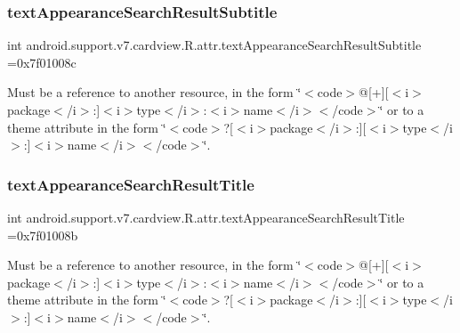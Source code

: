 \subsubsection{\texorpdfstring{text\+Appearance\+Search\+Result\+Subtitle}{textAppearanceSearchResultSubtitle}}
{\footnotesize\ttfamily int android.\+support.\+v7.\+cardview.\+R.\+attr.\+text\+Appearance\+Search\+Result\+Subtitle =0x7f01008c\hspace{0.3cm}{\ttfamily [static]}}

Must be a reference to another resource, in the form \char`\"{}$<$code$>$@\mbox{[}+\mbox{]}\mbox{[}$<$i$>$package$<$/i$>$\+:\mbox{]}$<$i$>$type$<$/i$>$\+:$<$i$>$name$<$/i$>$$<$/code$>$\char`\"{} or to a theme attribute in the form \char`\"{}$<$code$>$?\mbox{[}$<$i$>$package$<$/i$>$\+:\mbox{]}\mbox{[}$<$i$>$type$<$/i$>$\+:\mbox{]}$<$i$>$name$<$/i$>$$<$/code$>$\char`\"{}. \mbox{\label{classandroid_1_1support_1_1v7_1_1cardview_1_1R_1_1attr_a7ef9f14e832603a80a69a476d01e22f3}} 
\subsubsection{\texorpdfstring{text\+Appearance\+Search\+Result\+Title}{textAppearanceSearchResultTitle}}
{\footnotesize\ttfamily int android.\+support.\+v7.\+cardview.\+R.\+attr.\+text\+Appearance\+Search\+Result\+Title =0x7f01008b\hspace{0.3cm}{\ttfamily [static]}}

Must be a reference to another resource, in the form \char`\"{}$<$code$>$@\mbox{[}+\mbox{]}\mbox{[}$<$i$>$package$<$/i$>$\+:\mbox{]}$<$i$>$type$<$/i$>$\+:$<$i$>$name$<$/i$>$$<$/code$>$\char`\"{} or to a theme attribute in the form \char`\"{}$<$code$>$?\mbox{[}$<$i$>$package$<$/i$>$\+:\mbox{]}\mbox{[}$<$i$>$type$<$/i$>$\+:\mbox{]}$<$i$>$name$<$/i$>$$<$/code$>$\char`\"{}. \mbox{\label{classandroid_1_1support_1_1v7_1_1cardview_1_1R_1_1attr_a33d0659633dc1776cf97b3cce1cc6e27}} 
